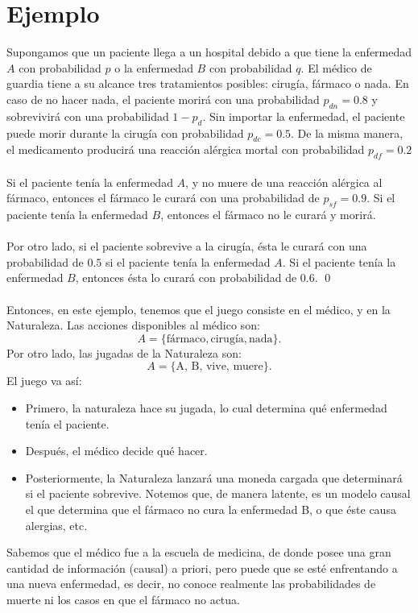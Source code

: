 \documentclass[11pt]{article}
\theoremstyle{plain}
\begin{document}
\section{Ejemplo}
Supongamos que un paciente llega a un hospital debido a que tiene la enfermedad $A$ con probabilidad $p$ o la enfermedad $B$ con probabilidad $q$. El médico de guardia tiene a su alcance tres tratamientos posibles: cirugía, fármaco o nada. En caso de no hacer nada, el paciente morirá con una probabilidad $p_{dn}=0.8$ y sobrevivirá con una probabilidad $1-p_d$. Sin importar la enfermedad, el paciente puede morir durante la cirugía con probabilidad $p_{dc}=0.5$. De la misma manera, el medicamento producirá una reacción alérgica mortal con probabilidad $p_{df}=0.2$\\
\\
Si el paciente tenía la enfermedad $A$, y no muere de una reacción alérgica al fármaco, entonces el fármaco le curará con una probabilidad de $p_{sf}=0.9$. Si el paciente tenía la enfermedad $B$, entonces el fármaco no le curará y morirá.\\
\\
Por otro lado, si el paciente sobrevive a la cirugía, ésta le curará con una probabilidad de $0.5$ si el paciente tenía la enfermedad $A$. Si el paciente tenía la enfermedad $B$, entonces ésta lo curará con probabilidad de $0.6$. \qed
\\
\\
Entonces, en este ejemplo, tenemos que el juego consiste en el médico, y en la Naturaleza. Las acciones disponibles al médico son:
\[ A= \{ \textrm{fármaco},  \textrm{cirugía}, \textrm{nada} \}. \]
Por otro lado, las jugadas de la Naturaleza son: 
\[ A= \{ \textrm{A, B, vive, muere} \}. \] 
El juego va así:
\begin{itemize}
\item Primero, la naturaleza hace su jugada, lo cual determina qué enfermedad tenía el paciente. 
\item Después, el médico decide qué hacer. 
\item Posteriormente, la Naturaleza lanzará una moneda cargada que determinará si el paciente sobrevive. Notemos que, de manera latente, es un modelo causal el que determina que el fármaco no cura la enfermedad B, o que éste causa alergias, etc.
\end{itemize}
Sabemos que el médico fue a la escuela de medicina, de donde posee una gran cantidad de información (causal) a priori, pero puede que se esté enfrentando a una nueva enfermedad, es decir, no conoce realmente las probabilidades de muerte ni los casos en que el fármaco no actua.\\
\end{document}
